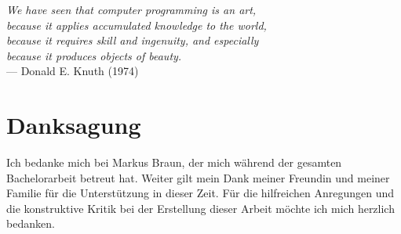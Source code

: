 
\begin{flushright}{\slshape
    We have seen that computer programming is an art, \\
    because it applies accumulated knowledge to the world, \\
    because it requires skill and ingenuity, and especially \\
    because it produces objects of beauty.} \\ \medskip
    --- Donald E. Knuth (1974)
\end{flushright}



\bigskip

\begingroup
\let\clearpage\relax
\let\cleardoublepage\relax
\let\cleardoublepage\relax
\chapter*{Danksagung}

Ich bedanke mich bei Markus Braun, der mich während der gesamten Bachelorarbeit betreut hat. Weiter gilt mein Dank meiner Freundin und meiner Familie für die Unterstützung in dieser Zeit. Für die hilfreichen Anregungen und die konstruktive Kritik bei der Erstellung dieser Arbeit möchte ich mich herzlich bedanken.


\endgroup



